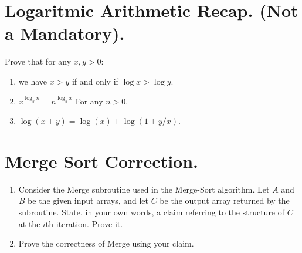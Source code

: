 \section{Logaritmic Arithmetic Recap. (Not a Mandatory).} 
 Prove that for any $x,y > 0$:
\begin{enumerate}
  \item we have $x>y$ if and only if $\log x > \log y$. 
  \item $x^{\log_{y}n} = n^{\log_{y}x}$ For any $n > 0$. 
  \item $\log (x \pm y) = \log (x) + \log (1 \pm y/x)$. 
\end{enumerate}

\ifdefined\SOLUTION

\fi

\section{Merge Sort Correction.}
\begin{enumerate}
\item Consider the Merge subroutine used in the Merge-Sort algorithm. Let $A$ and $B$ be the given input arrays, and let $C$ be the output array returned by the subroutine. State, in your own words, a claim referring to the structure of $C$ at the $i$th iteration. Prove it.
\item Prove the correctness of Merge using your claim.
\end{enumerate}
\ifdefined\SOLUTION
